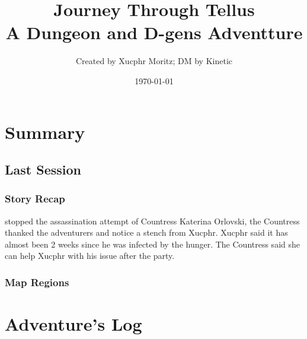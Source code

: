\documentclass[letterpaper,twocolumn,openany,nodeprecatedcode]{dndbook}
\title{Journey Through Tellus \\
\large A Dungeon and D-gens Adventture}
\author{Created by Xucphr Moritz; DM by Kinetic}
\date{\today}
\begin{document}
\frontmatter

\maketitle

\tableofcontents

\mainmatter%

\part{Summary}


\chapter*{Last Session}
\section{Story Recap}
 stopped the assassination attempt of Countress Katerina Orlovski, the Countress thanked the adventurers and notice a stench from Xucphr. Xucphr said it has almost been 2 weeks since he was infected by the hunger. The Countress said she can help Xucphr with his issue after the party.

\section{Map Regions}


\part{Adventure's Log}


%


%


%
\end{document}
